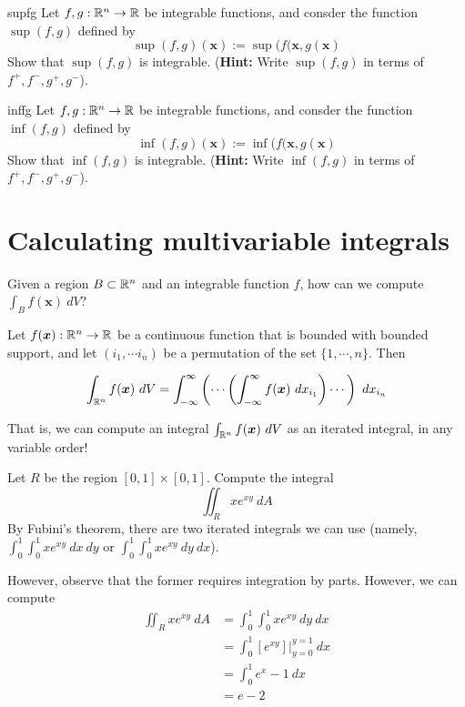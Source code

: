 \begin{problem}{supfg}
    Let $f,g : \mathbb{R}^n \to \mathbb{R}$ be integrable functions, and consder the function $\sup(f,g)$ defined by $$\sup(f,g)(\bm{x}) := \sup(f(\bm{x},g(\bm{x})$$ Show that $\sup(f,g)$ is integrable.
    (\textbf{Hint:} Write $\sup(f,g)$ in terms of $f^+,f^-,g^+,g^-$).
\end{problem}

\begin{problem}{inffg}
    Let $f,g : \mathbb{R}^n \to \mathbb{R}$ be integrable functions, and consder the function $\inf(f,g)$ defined by $$\inf(f,g)(\bm{x}) := \inf(f(\bm{x},g(\bm{x})$$ Show that $\inf(f,g)$ is integrable.
    (\textbf{Hint:} Write $\inf(f,g)$ in terms of $f^+,f^-,g^+,g^-$).
\end{problem}



\section{Calculating multivariable integrals}

    \begin{motivating}
        Given a region $B \subset \mathbb{R}^n$ and an integrable function $f$, how can we compute $\int_B f(\bm{x}) \ dV$?
    \end{motivating}

    \begin{theorem}[Fubini]
    Let $f(\bm{x}): \mathbb{R}^n \to \mathbb{R}$ be a continuous function that is bounded with bounded support, and let $(i_1, \cdots i_n)$ be a permutation of the set $\{1, \cdots, n\}$. Then 
    
    $$\int_{\mathbb{R}^n} f(\bm{x}) \ dV = \int_{-\infty}^{\infty} \left( \cdots \left(\int_{-\infty}^{\infty} f(\bm{x}) \ dx_{i_1} \right) \cdots \right) \ dx_{i_n}$$

    \end{theorem}

    That is, we can compute an integral $\int_{\mathbb{R}^n} f(\bm{x}) \ dV$ as an iterated integral, in any variable order!

    \begin{example}
        Let $R$ be the region $[0,1] \times [0,1]$.  Compute the integral 
        $$\iint_R xe^{xy} \ dA $$
        By Fubini's theorem, there are two iterated integrals we can use (namely, $\int_0^1\int_0^1 xe^{xy} \ dx \ dy$ or $\int_0^1\int_0^1 xe^{xy} \ dy \ dx$).  

        However, observe that the former requires integration by parts.  However, we can compute 
        \begin{align*}
            \iint_R xe^{xy} \ dA  &= \int_0^1\int_0^1 xe^{xy} \ dy \ dx \\
            &= \int_0^1 [e^{xy}] \bigg|_{y=0}^{y=1} \ dx \\
            &= \int_0^1 e^{x}-1 \ dx \\
            &= e-2
        \end{align*}
        
    \end{example}


